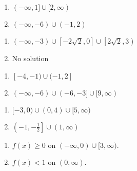 \begin{multicols}{2}
\begin{enumerate}
\setcounter{enumi}{\value{HW}}

\item $(-\infty, 1] \cup [2, \infty)$
\item $(-\infty, -6) \cup (-1, 2)$

\setcounter{HW}{\value{enumi}}
\end{enumerate}
\end{multicols}

\begin{multicols}{2}
\begin{enumerate}
\setcounter{enumi}{\value{HW}}

\item $(-\infty, -3) \cup \left[-2\sqrt{2}, 0\right] \cup \left[2\sqrt{2}, 3\right)$
\item No solution

\setcounter{HW}{\value{enumi}}
\end{enumerate}
\end{multicols}

\begin{multicols}{2}
\begin{enumerate}
\setcounter{enumi}{\value{HW}}

\item  $[-4, -1) \cup (-1,2]$
\item   $(-\infty, -6) \cup (-6, -3] \cup [9, \infty)$

\setcounter{HW}{\value{enumi}}
\end{enumerate}
\end{multicols}

\begin{multicols}{2}
\begin{enumerate}
\setcounter{enumi}{\value{HW}}

\item $[-3,0) \cup (0,4) \cup [5, \infty)$
\item  $\left(-1,-\frac{1}{2}\right] \cup (1, \infty)$

\setcounter{HW}{\value{enumi}}
\end{enumerate}
\end{multicols}

\begin{multicols}{2}
\begin{enumerate}
\setcounter{enumi}{\value{HW}}

\item $f(x) \geq 0$ on $(-\infty, 0) \cup [3, \infty)$.

\item $f(x) < 1$ on $(0, \infty)$.

\setcounter{HW}{\value{enumi}}
\end{enumerate}
\end{multicols}

